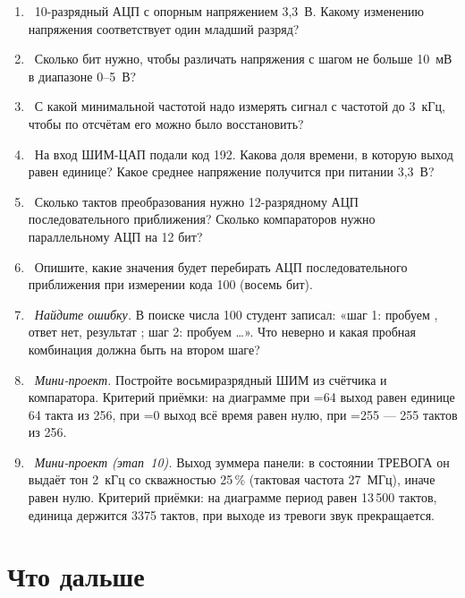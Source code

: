 \begin{taskbox}
\begin{enumerate}
  \item {}~10-разрядный АЦП с опорным напряжением 3,3~В. Какому изменению
        напряжения соответствует один младший разряд?
  \item {}~Сколько бит нужно, чтобы различать напряжения с шагом не больше
        10~мВ в диапазоне 0--5~В?
  \item {}~С какой минимальной частотой надо измерять сигнал с частотой
        до 3~кГц, чтобы по отсчётам его можно было восстановить?
  \item {}~На вход ШИМ-ЦАП подали код 192. Какова доля времени, в которую
        выход равен единице? Какое среднее напряжение получится при питании
        3,3~В?
  \item {}~Сколько тактов преобразования нужно 12-разрядному АЦП
        последовательного приближения? Сколько компараторов нужно параллельному
        АЦП на 12 бит?
  \item {}~Опишите, какие значения будет перебирать АЦП последовательного
        приближения при измерении кода 100 (восемь бит).
  \item {}~\emph{Найдите ошибку.} В поиске числа 100 студент записал:
        «шаг 1: пробуем , ответ нет, результат ; шаг 2:
        пробуем \ldots». Что неверно и какая пробная
        комбинация должна быть на втором шаге?
  \item {}~\emph{Мини-проект.} Постройте восьмиразрядный ШИМ из счётчика и
        компаратора. Критерий приёмки: на диаграмме при =64 выход
        равен единице 64 такта из 256, при =0 выход всё время
        равен нулю, при =255 --- 255 тактов из 256.
  \item {}~\emph{Мини-проект (этап~10).} Выход зуммера панели: в состоянии
        ТРЕВОГА он выдаёт тон 2~кГц со скважностью 25\,\% (тактовая частота
        27~МГц), иначе равен нулю. Критерий приёмки: на диаграмме период равен
        13\,500 тактов, единица держится 3375 тактов, при выходе из тревоги
        звук прекращается.
\end{enumerate}
\end{taskbox}

\section{Что дальше}

